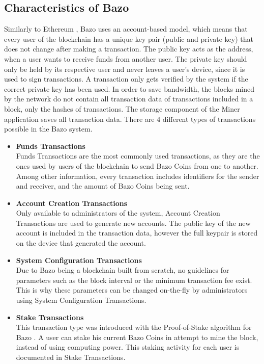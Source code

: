 \subsection{Characteristics of Bazo}
Similarly to Ethereum \cite{ethereum}, Bazo uses an account-based model, which means that every user of the blockchain has a unique key pair (public and private key) that does not change after making a transaction. The public key acts as the address, when a user wants to receive funds from another user. The private key should only be held by its respective user and never leaves a user's device, since it is used to sign transactions. A transaction only gets verified by the system if the correct private key has been used. In order to save bandwidth, the blocks mined by the network do not contain all transaction data of transactions included in a block, only the hashes of transactions. The storage component of the Miner application saves all transaction data. There are 4 different types of transactions possible in the Bazo system.

\begin{itemize}
\item \textbf{Funds Transactions}\\
Funds Transactions are the most commonly used transactions, as they are the ones used by users of the blockchain to send Bazo Coins from one to another. Among other information, every transaction includes identifiers for the sender and receiver, and the amount of Bazo Coins being sent.
\item \textbf{Account Creation Transactions}\\
Only available to administrators of the system, Account Creation Transactions are used to generate new accounts. The public key of the new account is included in the transaction data, however the full keypair is stored on the device that generated the account.
\item \textbf{System Configuration Transactions}\\
Due to Bazo being a blockchain built from scratch, no guidelines for parameters such as the block interval or the minimum transaction fee exist. This is why these parameters can be changed on-the-fly by administrators using System Configuration Transactions.
\item \textbf{Stake Transactions}\\
This transaction type was introduced with the Proof-of-Stake algorithm for Bazo \cite{pos}. A user can stake his current Bazo Coins in attempt to mine the block, instead of using computing power. This staking activity for each user is documented in Stake Transactions.
\end{itemize}

